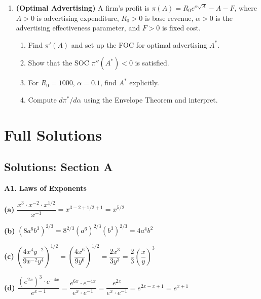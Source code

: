 \documentclass[12pt, a4paper]{article}
\theoremstyle{definition}
\begin{document}
\begin{enumerate}[label=\textbf{D\arabic*.}, leftmargin=2.5em]
\item \textbf{(Optimal Advertising)} A firm's profit is $\pi(A) = R_0 e^{\alpha\sqrt{A}} - A - F$, where $A>0$ is advertising expenditure, $R_0>0$ is base revenue, $\alpha>0$ is the advertising effectiveness parameter, and $F>0$ is fixed cost.
\begin{enumerate}[label=(\alph*)]
  \item Find $\pi'(A)$ and set up the FOC for optimal advertising $A^*$.
  \item Show that the SOC $\pi''(A^*)<0$ is satisfied.
  \item For $R_0=1000$, $\alpha=0.1$, find $A^*$ explicitly.
  \item Compute $d\pi^*/d\alpha$ using the Envelope Theorem and interpret.
\end{enumerate}

\end{enumerate}

\newpage
\section{Full Solutions}

\subsection{Solutions: Section A}

\begin{solbox}
\textbf{A1. Laws of Exponents}

\textbf{(a)} $\dfrac{x^3 \cdot x^{-2} \cdot x^{1/2}}{x^{-1}} = x^{3-2+1/2+1} = x^{5/2}$

\textbf{(b)} $(8a^6b^3)^{2/3} = 8^{2/3}(a^6)^{2/3}(b^3)^{2/3} = 4a^4b^2$

\textbf{(c)} $\left(\dfrac{4x^4y^{-2}}{9x^{-2}y^4}\right)^{1/2}
= \left(\dfrac{4x^6}{9y^6}\right)^{1/2}
= \dfrac{2x^3}{3y^3} = \dfrac{2}{3}\left(\dfrac{x}{y}\right)^3$

\textbf{(d)} $\dfrac{(e^{2x})^3 \cdot e^{-4x}}{e^{x-1}}
= \dfrac{e^{6x} \cdot e^{-4x}}{e^x \cdot e^{-1}}
= \dfrac{e^{2x}}{e^x \cdot e^{-1}}
= e^{2x-x+1} = e^{x+1}$
\end{solbox}
\end{document}

